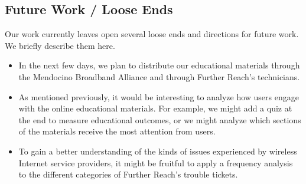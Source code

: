 \subsection{Future Work / Loose Ends}

Our work currently leaves open several loose ends and directions for future
work. We briefly describe them here.

\begin{itemize}
\item In the next few days, we plan to distribute our educational materials
through the Mendocino Broadband Alliance and through Further Reach's
technicians.
\item As mentioned previously, it would be interesting to analyze how users
engage with the online educational materials. For example, we might add a
quiz at the end to measure educational outcomes, or we might analyze which
sections of the materials receive the most
attention from users.
\item To gain a better understanding of the kinds of issues experienced by
wireless Internet service providers, it might be fruitful to apply a frequency
analysis to the different categories of Further Reach's trouble tickets.
\end{itemize}

